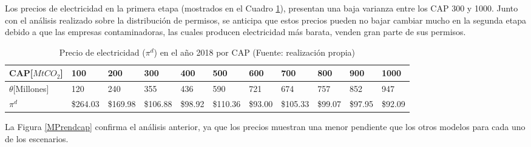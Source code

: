 Los precios de electricidad en la primera etapa (mostrados en el Cuadro \ref{Ppidporcap}), presentan una baja varianza entre los CAP 300 y 1000. Junto con el análisis realizado sobre la distribución de permisos, se anticipa que estos precios pueden no bajar cambiar mucho en la segunda etapa debido a que las empresas contaminadoras, las cuales producen electricidad más barata, venden gran parte de sus permisos.
\vspace{2.5mm}


\begin{table}[H]
\begin{footnotesize}
    \centering
    \begin{tabular}{|l|l|l|l|l|l|l|l|l|l|l|}
    \hline
       CAP[$MtCO_2$] & 100 & 200 & 300 & 400 & 500 & 600 & 700 & 800 & 900 & 1000 \\ \hline
          $\theta$[Millones] & 120 & 240 & 355 & 436 & 590 & 721 & 674 & 757 & 852 & 947 \\ \hline
    $\pi^d$  &  \$264.03   &  \$169.98   &  \$106.88   &  \$98.92   &  \$110.36   &  \$93.00   &  \$105.33   &  \$99.07   &  \$97.95   &  \$92.09   \\ \hline
    \end{tabular}
    \caption{{\footnotesize Precio de electricidad ($\pi^d$) en el año 2018 por CAP (Fuente: realización propia)}}
    \label{Ppidporcap}
\end{footnotesize}
\end{table}

La Figura \ref{MPrendcap} confirma el análisis anterior, ya que los precios muestran una menor pendiente que los otros modelos para cada uno de los escenarios.
\vspace{2.5mm}

